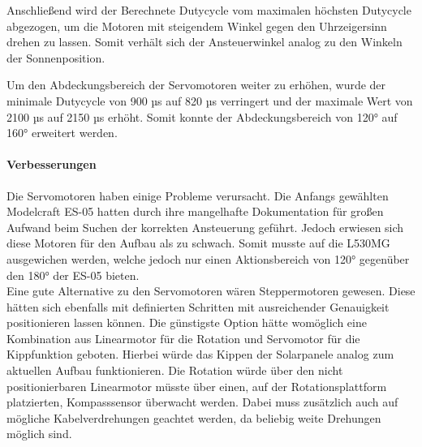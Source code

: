 Anschließend wird der Berechnete Dutycycle vom maximalen höchsten Dutycycle abgezogen, um die Motoren mit steigendem Winkel gegen den Uhrzeigersinn drehen zu lassen.
Somit verhält sich der Ansteuerwinkel analog zu den Winkeln der Sonnenposition.

Um den Abdeckungsbereich der Servomotoren weiter zu erhöhen, wurde der minimale Dutycycle von 900 µs auf 820 µs verringert und der maximale Wert von 2100 µs auf 2150 µs erhöht.
Somit konnte der Abdeckungsbereich von 120° auf 160° erweitert werden.

\paragraph{Verbesserungen}
Die Servomotoren haben einige Probleme verursacht.
Die Anfangs gewählten Modelcraft ES-05 hatten durch ihre mangelhafte Dokumentation für großen Aufwand beim Suchen der korrekten Ansteuerung geführt.
Jedoch erwiesen sich diese Motoren für den Aufbau als zu schwach.
Somit musste auf die L530MG ausgewichen werden, welche jedoch nur einen Aktionsbereich von 120° gegenüber den 180° der ES-05 bieten. \\

Eine gute Alternative zu den Servomotoren wären Steppermotoren gewesen.
Diese hätten sich ebenfalls mit definierten Schritten mit ausreichender Genauigkeit positionieren lassen können.
Die günstigste Option hätte womöglich eine Kombination aus Linearmotor für die Rotation und Servomotor für die Kippfunktion geboten.
Hierbei würde das Kippen der Solarpanele analog zum aktuellen Aufbau funktionieren.
Die Rotation würde über den nicht positionierbaren Linearmotor müsste über einen, auf der Rotationsplattform platzierten, Kompasssensor überwacht werden.
Dabei muss zusätzlich auch auf mögliche Kabelverdrehungen geachtet werden, da beliebig weite Drehungen möglich sind.
